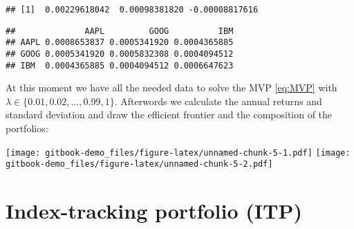 \documentclass[
  oneside]{book}
\newenvironment{Shaded}{\begin{snugshade}}{\end{snugshade}}
\newcommand{\FunctionTok}[1]{\textcolor[rgb]{0.00,0.00,0.00}{#1}}
\newcommand{\NormalTok}[1]{#1}
\newcommand{\OtherTok}[1]{\textcolor[rgb]{0.56,0.35,0.01}{#1}}
\newcommand{\SpecialCharTok}[1]{\textcolor[rgb]{0.00,0.00,0.00}{#1}}
\begin{document}
\begin{verbatim}
## [1]  0.00229618042  0.00098381820 -0.00008817616
\end{verbatim}

\begin{Shaded}
\end{Shaded}

\begin{verbatim}
##              AAPL         GOOG          IBM
## AAPL 0.0008653837 0.0005341920 0.0004365885
## GOOG 0.0005341920 0.0005832308 0.0004094512
## IBM  0.0004365885 0.0004094512 0.0006647623
\end{verbatim}

At this moment we have all the needed data to solve the MVP \eqref{eq:MVP} with \(\lambda \in \{0.01, 0.02, ..., 0.99, 1\}\). Afterwords we calculate the annual returns and standard deviation and draw the efficient frontier and the composition of the portfolios:

\texttt{[image: gitbook-demo\_files/figure-latex/unnamed-chunk-5-1.pdf]} \texttt{[image: gitbook-demo\_files/figure-latex/unnamed-chunk-5-2.pdf]}

\hypertarget{index-tracking-portfolio-itp}{%
\section{Index-tracking portfolio (ITP)}\label{index-tracking-portfolio-itp}}
\end{document}
